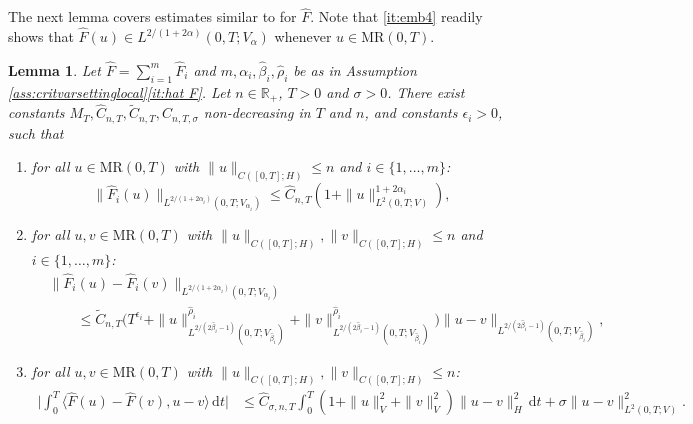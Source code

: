 \documentclass{amsart}
\newcommand{\dd}{\,\mathrm{d}}
\renewcommand{\MR}{\mathrm{MR}}
\newcommand{\<}{\langle}
\newcommand{\?}{\rangle}
\theoremstyle{plain}
\theoremstyle{remark}
\theoremstyle{plain}
\newtheorem{lemma}[theorem]{Lemma}
\numberwithin{equation}{section}
\def\R{{\mathbb R}}
\begin{document}
The next lemma covers estimates similar to \cite[Lem.\ 3.8 (iv)(v)]{TV24} for $\hat{F}$. Note that \ref{it:emb4} readily shows that $\hat{F}(u)\in L^{2/(1+2\alpha)}(0,T;V_{\alpha})$ whenever $u\in\MR(0,T)$. 

\begin{lemma}\label{lem: 3.8 extra F}
 Let   $\hat{F}=\sum_{i=1}^m \hat{F}_i$ and $m,\alpha_i,\hat{\beta}_i,\hat{\rho}_i$ be as in Assumption \ref{ass:critvarsettinglocal}\ref{it:hat F}.  
  Let $n\in\R_+$, $T>0$ and  $\sigma>0$. 
  There exist  constants $M_T,\hat{C}_{n,T},\tilde{C}_{n,T},C_{n,T,\sigma}$ non-decreasing in $T$ and $n$, and constants $\epsilon_i>0$,  such that
  \begin{enumerate}[label=\emph{(\roman*)},ref=\textup{(\roman*)}]
  \item \label{it:emb4} for all $u\in\MR(0,T)$ with $\|u\|_{C([0,T];H)}\leq n$ and $i\in\{1,\ldots,m\}$:
  \begin{equation*}\label{eq: estimate hat F}
  \|\hat{F}_i(u)\|_{L^{2/(1+2\alpha_i)}(0,T;V_{\alpha_i})}  
   \leq \hat{C}_{n,T}(1+\|u\|_{L^2(0,T;V)}^{1+2\alpha_i}), 
  \end{equation*}
  \item \label{it:emb5} for all $u,v\in\MR(0,T)$ with $\|u\|_{C([0,T];H)},\|v\|_{C([0,T];H)}\leq n$ and $i\in\{1,\ldots,m\}$:
  \begin{align*}\label{eq: estimate hat F difference} 
  &\|\hat{F}_i(u)-\hat{F}_i(v)\|_{L^{2/(1+2\alpha_i)}(0,T;V_{\alpha_i})} \\  
  &\qquad\leq \tilde{C}_{n,T} \Big(T^{\epsilon_i}+\|u\|_{L^{{2}/({2\hat{\beta}_i-1})}(0,T;V_{\hat{\beta}_i})}^{\hat{\rho}_i}+\|v\|_{L^{{2}/({2\hat{\beta}_i-1})}(0,T;V_{\hat{\beta}_i})}^{ \hat{\rho}_i}\Big)\|u-v\|_{L^{{2}/({2\hat{\beta}_i-1})}(0,T;V_{\hat{\beta}_i})}, 
  \end{align*}
  \item \label{it:emb6} for all $u,v\in\MR(0,T)$ with $\|u\|_{C([0,T];H)},\|v\|_{C([0,T];H)}\leq n$:
  \begin{align*} 
  \Big|\int_0^T\<\hat{F}(u)-\hat{F}(v),u-v\?\dd t   \Big|
  &\leq \hat{C}_{\sigma,n,T} \int_0^T  (1+\|u\|_V^2+ \|v\|_V^2)\|u-v\|_H^2\dd t+\sigma\|u-v\|_{L^2(0,T;V)}^2. 
  \end{align*} 
  \end{enumerate}
\end{lemma}
\end{document}
